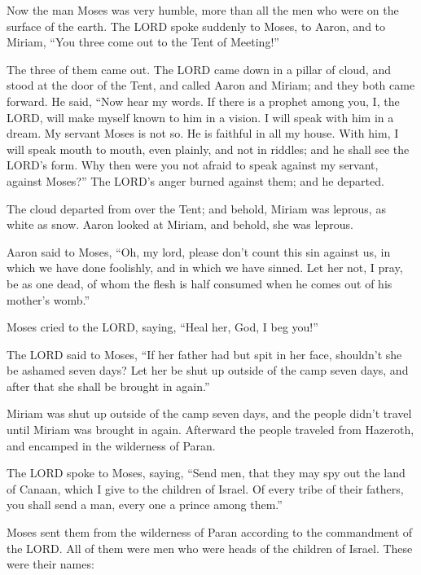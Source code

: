 \myverse{}Now the man Moses was very humble, more than all the men who were
on the surface of the earth.
\myverse{}The LORD spoke suddenly to Moses, to Aaron, and to Miriam, “You three come
out to the Tent of Meeting!”

The three of them came out.
\myverse{}The LORD came down in a pillar of cloud, and stood at the door of the Tent,
and called Aaron and Miriam; and they both came forward.
\myverse{}He said, “Now hear my words. If there is a prophet among you, I, the LORD,
will make myself known to him in a vision. I will speak with him in a dream.
\myverse{}My servant Moses is not so. He is faithful in all my house.
\myverse{}With him, I will speak mouth to mouth, even plainly, and not in riddles; and
he shall see the LORD’s form. Why then were you not afraid to speak against my servant, against Moses?”
\myverse{}The LORD’s anger burned against them; and he departed.


\myverse{}The cloud departed from over the Tent; and behold, Miriam was
leprous, as white as snow. Aaron looked at Miriam, and behold, she was leprous.


\myverse{}Aaron said to Moses, “Oh, my lord, please don’t count this sin
against us, in which we have done foolishly, and in which we have sinned.
\myverse{}Let her not, I pray, be as one dead, of whom the flesh is half consumed when
he comes out of his mother’s womb.”


\myverse{}Moses cried to the LORD, saying, “Heal her, God, I beg you!”


\myverse{}The LORD said to Moses, “If her father had but spit in her face,
shouldn’t she be ashamed seven days? Let her be shut up outside of the camp seven days, and after that
she shall be brought in again.”


\myverse{}Miriam was shut up outside of the camp seven days, and the people
didn’t travel until Miriam was brought in again.
\myverse{}Afterward the people traveled from Hazeroth, and encamped in the wilderness
of Paran.


\mychapter{} \myverse*{}The LORD spoke to Moses, saying,
\myverse{}“Send men, that they may spy out the land of Canaan, which I give to the children
of Israel. Of every tribe of their fathers, you shall send a man, every one a prince among them.”


\myverse{}Moses sent them from the wilderness of Paran according to the
commandment of the LORD. All of them were men who were heads of the children of Israel.
\myverse{}These were their names:

